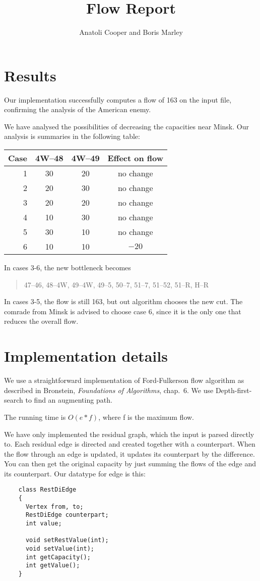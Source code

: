\documentclass{tufte-handout}
\title{Flow Report}
\author{Anatoli Cooper and Boris Marley}
\begin{document}
  \maketitle

  \section{Results}

  Our implementation successfully computes a flow of 163 on the input file, confirming the analysis of the American enemy.

  We have analysed the possibilities of decreasing the capacities near Minsk.
  Our analysis is summaries in the following table:

\bigskip
  \begin{tabular}{rccc}\toprule
    Case & 4W--48 & 4W--49 & Effect on flow \\\midrule
    1& 30& 20 & no change \\
    2& 20& 30 & no change \\
    3& 20& 20 & no change \\
    4& 10& 30 & no change \\
    5& 30& 10 & no change \\
    6& 10& 10 & $-20$ \\\bottomrule
  \end{tabular}
  \bigskip

  In cases 3-6, the new bottleneck becomes
  \begin{quote}
      47--46, 48--4W, 49--4W, 49--5, 50--7, 51--7, 51--52, 51--R, H--R
  \end{quote}
  In cases 3-5, the flow is still 163, but out algorithm chooses the new cut.
  The comrade from Minsk is advised to choose case 6, since it is the only one that reduces the overall flow.

  \section{Implementation details}

  We use a straightforward implementation of Ford-Fulkerson flow algorithm as described in Bronstein, \emph{Foundations of Algorithms}, chap.~6.
  We use Depth-first-search to find an augmenting path.

  The running time is $O(e*f)$, where f is the maximum flow.

  We have only implemented the residual graph, which the input is parsed directly to. Each residual edge is directed and created together with a counterpart. When the flow through an edge is updated, it updates its counterpart by the difference. You can then get the original capacity by just summing the flows of the edge and its counterpart.
  Our datatype for edge is this:
  \begin{verbatim}
    class RestDiEdge
    {
      Vertex from, to;
      RestDiEdge counterpart;
      int value;
      
      void setRestValue(int);
      void setValue(int);
      int getCapacity();
      int getValue(); 
    }
  \end{verbatim}


\end{document}
